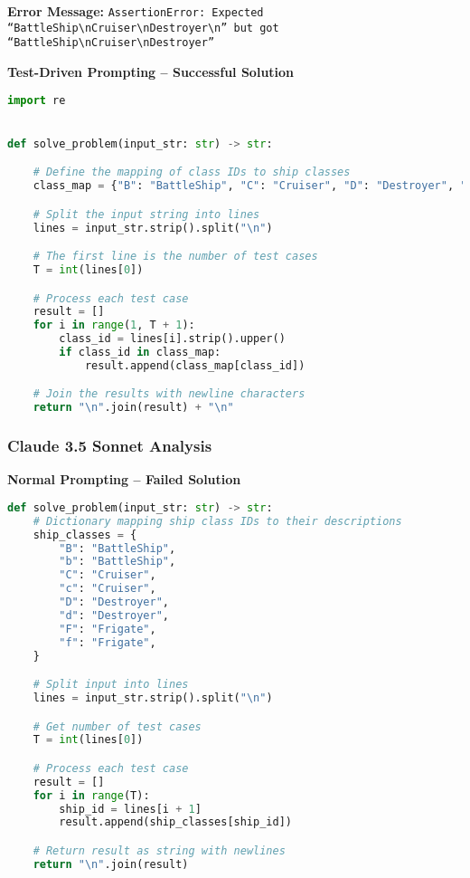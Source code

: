 \documentclass{article}
\begin{document}
\textbf{Error Message:}
\texttt{AssertionError: Expected ``BattleShip\textbackslash nCruiser\textbackslash nDestroyer\textbackslash n'' but got ``BattleShip\textbackslash nCruiser\textbackslash nDestroyer''}

\textbf{Test-Driven Prompting -- Successful Solution}
\begin{lstlisting}[language=python]
import re


def solve_problem(input_str: str) -> str:

    # Define the mapping of class IDs to ship classes
    class_map = {"B": "BattleShip", "C": "Cruiser", "D": "Destroyer", "F": "Frigate"}

    # Split the input string into lines
    lines = input_str.strip().split("\n")

    # The first line is the number of test cases
    T = int(lines[0])

    # Process each test case
    result = []
    for i in range(1, T + 1):
        class_id = lines[i].strip().upper()
        if class_id in class_map:
            result.append(class_map[class_id])

    # Join the results with newline characters
    return "\n".join(result) + "\n"
\end{lstlisting}

\subsubsection{Claude 3.5 Sonnet Analysis}

\textbf{Normal Prompting -- Failed Solution}
\begin{lstlisting}[language=python]
def solve_problem(input_str: str) -> str:
    # Dictionary mapping ship class IDs to their descriptions
    ship_classes = {
        "B": "BattleShip",
        "b": "BattleShip",
        "C": "Cruiser",
        "c": "Cruiser",
        "D": "Destroyer",
        "d": "Destroyer",
        "F": "Frigate",
        "f": "Frigate",
    }

    # Split input into lines
    lines = input_str.strip().split("\n")

    # Get number of test cases
    T = int(lines[0])

    # Process each test case
    result = []
    for i in range(T):
        ship_id = lines[i + 1]
        result.append(ship_classes[ship_id])

    # Return result as string with newlines
    return "\n".join(result)
\end{lstlisting}
\end{document}
